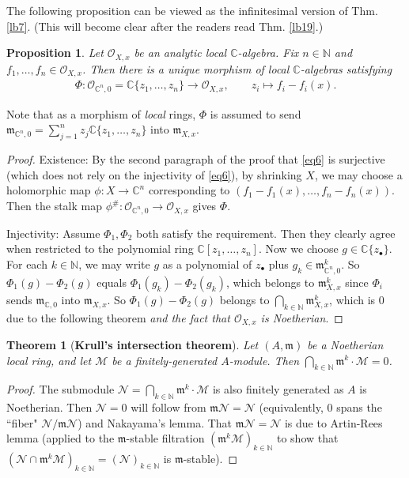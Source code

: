 \documentclass[12pt,b5paper,notitlepage]{report}
\theoremstyle{definition}
\theoremstyle{plain}
\newtheorem{thm}[df]{Theorem}
\newtheorem{pp}[df]{Proposition}
\newcommand{\fk}{\mathfrak}
\newcommand{\mc}{\mathcal}
\newcommand{\scr}{\mathscr}
\newcommand{\blt}{\bullet}
\newcommand{\Cbb}{\mathbb C}
\newcommand{\Nbb}{\mathbb N}
\numberwithin{equation}{section}
\begin{document}
The following proposition can be viewed as the infinitesimal version of Thm. \ref{lb7}. (This will become clear after the readers read Thm. \ref{lb19}.)

\begin{pp}\label{lb8}
Let $\scr O_{X,x}$ be an analytic local $\Cbb$-algebra. Fix $n\in\Nbb$ and $f_1,\dots,f_n\in\scr O_{X,x}$. Then there is a unique morphism of local $\Cbb$-algebras satisfying
\begin{align}
\Phi:\scr O_{\Cbb^n,0}=\Cbb\{z_1,\dots,z_n\}\rightarrow \scr O_{X,x},\qquad z_i\mapsto f_i-f_i(x).
\end{align}
\end{pp}

Note that as a morphism of \textit{local} rings, $\Phi$ is assumed to send $\fk m_{\Cbb^n,0}=\sum_{j=1}^n z_j\Cbb\{z_1,\dots,z_n\}$ into $\fk m_{X,x}$.



\begin{proof}
Existence: By the second paragraph of the proof that \eqref{eq6} is surjective (which does not rely on the injectivity of \eqref{eq6}), by shrinking $X$, we may choose a holomorphic map $\phi:X\rightarrow\Cbb^n$ corresponding to $(f_1-f_1(x),\dots,f_n-f_n(x))$. Then the stalk map $\phi^\#:\scr O_{\Cbb^n,0}\rightarrow\scr O_{X,x}$ gives $\Phi$.

Injectivity: Assume $\Phi_1,\Phi_2$ both satisfy the requirement. Then they clearly agree when restricted to the polynomial ring $\Cbb[z_1,\dots,z_n]$. Now we choose $g\in\Cbb\{z_\blt\}$. For each $k\in\Nbb$, we may write $g$ as a polynomial of $z_\blt$ plus $g_k\in\fk m_{\Cbb^n,0}^k$. So $\Phi_1(g)-\Phi_2(g)$ equals $\Phi_1(g_k)-\Phi_2(g_k)$, which belongs to $\fk m_{X,x}^k$ since  $\Phi_i$  sends $\fk m_{\Cbb,0}$ into $\fk m_{X,x}$. So $\Phi_1(g)-\Phi_2(g)$ belongs to $\bigcap_{k\in\Nbb}\fk m_{X,x}^k$, which is $0$ due to the following theorem \textit{and the fact that $\scr O_{X,x}$ is Noetherian}.
\end{proof}



\begin{thm}[\textbf{Krull's intersection theorem}]\label{lb162} 
Let $(A,\fk m)$ be a Noetherian local ring, and let $\mc M$ be a finitely-generated $A$-module. Then $\bigcap_{k\in\Nbb}\fk m^k\cdot \mc M=0$.
\end{thm}

\begin{proof}
The submodule $\mc N=\bigcap_{k\in\Nbb}\fk m^k\cdot \mc M$ is also finitely generated as $A$ is Noetherian. Then $\mc N=0$ will follow from $\fk m\mc N=\mc N$ (equivalently, $0$ spans the ``fiber" $\mc N/\fk m\mc N$) and  Nakayama's lemma. That  $\fk m\mc N=\mc N$ is due to Artin-Rees lemma (applied to the $\fk m$-stable filtration $(\fk m^k\mc M)_{k\in\Nbb}$ to show that $(\mc N\cap\fk m^k\mc M)_{k\in\Nbb}=(\mc N)_{k\in\Nbb}$ is $\fk m$-stable).
\end{proof}
\end{document}
